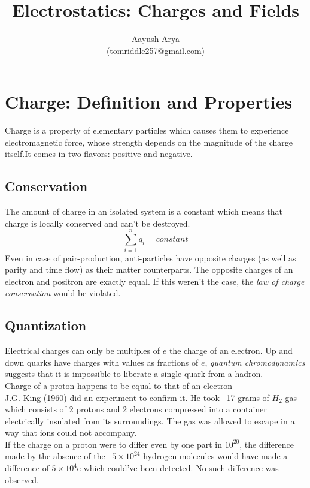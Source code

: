 \documentclass{article}
\title{Electrostatics: Charges and Fields}
\author{Aayush Arya\\ (tomriddle257@gmail.com)}
\begin{document}
	\maketitle
	
	\section*{Charge: Definition and Properties}
	Charge is a property of elementary particles which causes them to experience electromagnetic force, whose strength depends on the magnitude of the charge itself.It comes in two flavors: positive and negative.\\

	\subsection*{Conservation}
	The amount of charge in an isolated system is a constant \textemdash which means that charge is locally conserved and can't be destroyed.
	$$ \sum_{i=1}^{n} q_i = constant$$
	 Even in case of pair-production, anti-particles have opposite charges (as well as parity and time flow) as their matter counterparts. The opposite charges of an electron and positron are exactly equal. If this weren't the case, the \textit{law of charge conservation} would be violated. \\
	
	\subsection*{Quantization}
	
	Electrical charges can only be multiples of $e$ \textemdash the charge of an electron. Up and down quarks have charges with values as fractions of $e$, \textit{quantum chromodynamics} suggests that it is impossible to liberate a single quark from a hadron.\\
	
	Charge of a proton happens to be equal to that of an electron \\ J.G. King (1960) did an experiment to confirm it. He took ~17 grams of $H_2$ gas \textemdash which consists of 2 protons and 2 electrons \textemdash  compressed into a container electrically insulated from its surroundings. The gas was allowed to escape in a way that ions could not accompany.\\
	If the charge on a proton were to differ even by one part in $10^{20}$, the difference made by the absence of the ~$5\times 10^{24}$ hydrogen molecules would have made a difference of $5\times10^{4}$e which could've been detected. No such difference was observed.
	
\end{document}
